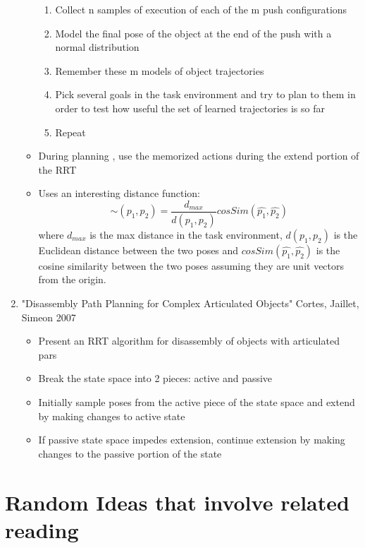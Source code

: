 \documentclass[11pt, oneside]{article}   	%
\begin{document}
\begin{enumerate}
\begin{itemize}
\begin{enumerate}
\item Collect n samples of execution of each of the m push configurations
\item Model the final pose of the object at the end of the push with a normal distribution
\item Remember these m models of object trajectories
\item Pick several goals in the task environment and try to plan to them in order to test how useful the set of learned trajectories is so far
\item Repeat
\end{enumerate}
\item During planning , use the memorized actions during the extend portion of the RRT
\item Uses an interesting distance function:
\[\sim(p_1, p_2) = \frac{d_{max}}{d(p_1, p_2)} cosSim(\hat{p_1}, \hat{p_2})\]
 where $d_{max}$ is the max distance in the task environment, $d(p_1, p_2)$ is the Euclidean distance between the two poses and $cosSim(\hat{p_1}, \hat{p_2})$ is the cosine similarity between the two poses assuming they are unit vectors from the origin.
\end{itemize}
\item "Disassembly Path Planning for Complex Articulated Objects" Cortes, Jaillet, Simeon 2007
\begin{itemize}
\item Present an RRT algorithm for disassembly of objects with articulated pars
\item Break the state space into 2 pieces: active and passive
\item Initially sample poses from the active piece of the state space and extend by making changes to active state
\item If passive state space impedes extension, continue extension by making changes to the passive portion of the state
\end{itemize}
\end{enumerate}

\section*{Random Ideas that involve related reading}
\end{document}
